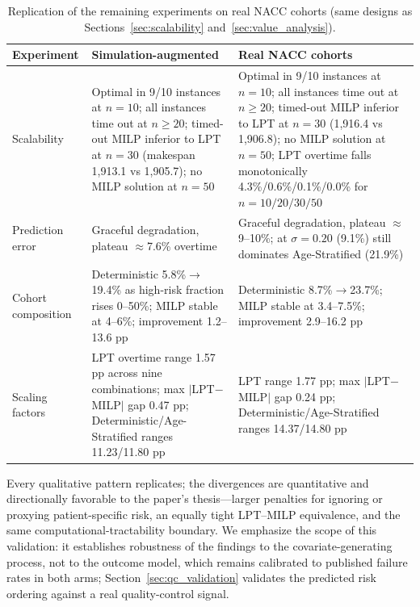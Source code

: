 \documentclass[11pt,a4paper]{article}
\begin{document}
{\begin{table}[H]
\centering
\color{red}
\caption{Replication of the remaining experiments on real NACC cohorts (same designs as Sections~\ref{sec:scalability} and~\ref{sec:value_analysis}).}
\label{tab:real_replication}
\begin{tabular}{@{}lp{5.2cm}p{5.6cm}@{}}
\toprule
\textbf{Experiment} & \textbf{Simulation-augmented} & \textbf{Real NACC cohorts} \\
\midrule
Scalability & Optimal in 9/10 instances at $n{=}10$; all instances time out at $n \geq 20$; timed-out MILP inferior to LPT at $n{=}30$ (makespan 1{,}913.1 vs 1{,}905.7); no MILP solution at $n{=}50$ & Optimal in 9/10 instances at $n{=}10$; all instances time out at $n \geq 20$; timed-out MILP inferior to LPT at $n{=}30$ (1{,}916.4 vs 1{,}906.8); no MILP solution at $n{=}50$; LPT overtime falls monotonically 4.3\%/0.6\%/0.1\%/0.0\% for $n = 10/20/30/50$ \\
\addlinespace
Prediction error & Graceful degradation, plateau $\approx$7.6\% overtime & Graceful degradation, plateau $\approx$9--10\%; at $\sigma{=}0.20$ (9.1\%) still dominates Age-Stratified (21.9\%) \\
\addlinespace
Cohort composition & Deterministic 5.8\%$\to$19.4\% as high-risk fraction rises 0--50\%; MILP stable at 4--6\%; improvement 1.2--13.6 pp & Deterministic 8.7\%$\to$23.7\%; MILP stable at 3.4--7.5\%; improvement 2.9--16.2 pp \\
\addlinespace
Scaling factors & LPT overtime range 1.57 pp across nine combinations; max $|$LPT$-$MILP$|$ gap 0.47 pp; Deterministic/Age-Stratified ranges 11.23/11.80 pp & LPT range 1.77 pp; max $|$LPT$-$MILP$|$ gap 0.24 pp; Deterministic/Age-Stratified ranges 14.37/14.80 pp \\
\bottomrule
\end{tabular}
\end{table}

Every qualitative pattern replicates; the divergences are quantitative and directionally favorable to the paper's thesis---larger penalties for ignoring or proxying patient-specific risk, an equally tight LPT--MILP equivalence, and the same computational-tractability boundary. We emphasize the scope of this validation: it establishes robustness of the findings to the covariate-generating process, not to the outcome model, which remains calibrated to published failure rates in both arms; Section~\ref{sec:qc_validation} validates the predicted risk ordering against a real quality-control signal.
}
\end{document}
